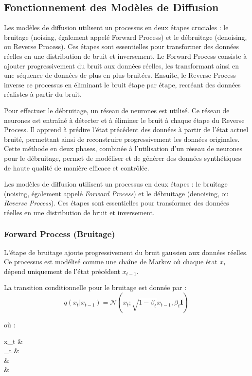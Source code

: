 \subsection{Fonctionnement des Modèles de Diffusion}

Les modèles de diffusion utilisent un processus en deux étapes cruciales : le
bruitage (noising, également appelé Forward Process) et le débruitage
(denoising, ou Reverse Process). Ces étapes sont essentielles pour transformer
des données réelles en une distribution de bruit et inversement. Le Forward
Process consiste à ajouter progressivement du bruit aux données réelles, les
transformant ainsi en une séquence de données de plus en plus bruitées.
Ensuite, le Reverse Process inverse ce processus en éliminant le bruit étape
par étape, recréant des données réalistes à partir du bruit.

Pour effectuer le débruitage, un réseau de neurones est utilisé. Ce réseau de
neurones est entraîné à détecter et à éliminer le bruit à chaque étape du
Reverse Process. Il apprend à prédire l'état précédent des données à partir de
l'état actuel bruité, permettant ainsi de reconstruire progressivement les
données originales. Cette méthode en deux phases, combinée à l'utilisation d'un
réseau de neurones pour le débruitage, permet de modéliser et de générer des
données synthétiques de haute qualité de manière efficace et contrôlée.


Les modèles de diffusion utilisent un processus en deux étapes : le bruitage
(noising, également appelé \textit{Forward Process}) et le débruitage
(denoising, ou \textit{Reverse Process}). Ces étapes sont essentielles pour
transformer des données réelles en une distribution de bruit et inversement.

\subsubsection{Forward Process (Bruitage)}

L'étape de bruitage ajoute progressivement du bruit gaussien aux données
réelles. Ce processus est modélisé comme une chaîne de Markov où chaque état \(
x_t \) dépend uniquement de l'état précédent \( x_{t-1} \).

La transition conditionnelle pour le bruitage est donnée par :
\[
	q(x_t | x_{t-1}) = \mathcal{N}(x_t; \sqrt{1 - \beta_t} x_{t-1}, \beta_t \mathbf{I})
\]

où :
\begin{conditions}
	x_t &  \\
	\beta_t &  \\
	 &  \\
	 & 
\end{conditions}

